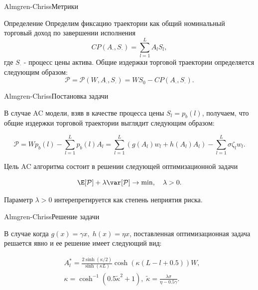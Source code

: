 \documentclass[aspectratio=169]{beamer}
\begin{document}
        \begin{frame}{Almgren-Chriss}{Метрики}
            \begin{block}{Определение}
                Определим фиксацию траектории как общий номинальный торговый доход по завершении исполнения  
                \begin{equation*}
                    CP( A_{\cdot}, S_{\cdot}) = \sum_{l=1}^L A_{l}S_l,
                \end{equation*}
                где $S_{\cdot}$ - процесс цены актива. 
                Общие издержки торговой траектории определяется следующим образом:
                \begin{equation*}
                    \mathcal P = \mathcal P(W, A_{\cdot}, S_{\cdot}) = WS_0 - CP(A_{\cdot}, S_{\cdot}).
                \end{equation*}
            \end{block}
        \end{frame}

        \begin{frame}{Almgren-Chriss}{Постановка задачи}

                В случае AC модели, взяв в качестве процесса цены $S_l = p_b(l)$, получаем, что общие издержки торговой траектории выглядит следующим образом:
        
            \begin{equation*}
                \mathcal P = Wp_b(l) - \sum\limits_{l=1}^L p_b(l)A_l = \sum\limits_{l=1}^L ( g(A_l)w_l + h(A_l)A_l) - \sum\limits_{l=1}^L \sigma \zeta_l w_l .
            \end{equation*}

            Цель AC алгоритма состоит в решении следующей оптимизационной задачи 

            \begin{equation*}
                \E [ \mathcal P] + \lambda \var[\mathcal P] \to \min, \quad \lambda > 0.
            \end{equation*}

            Параметр $\lambda > 0$ интерепретируется как степень неприятия риска.

        \end{frame}

        \begin{frame}{Almgren-Chriss}{Решение задачи}

            В случае когда $g(x) = \gamma x, \; h(x) = \eta x $, поставленная оптимизационная задача решается явно и ее решение имеет следующий вид:

            \begin{align} 
                &A_l^{*} = \frac{2 \sinh(\kappa/2)}{\sinh(\kappa L)}\cosh(\kappa (L - l + 0.5) )W, \label{Al}\\
                &\kappa = \cosh^{-1}(0.5\tilde \kappa^2 + 1), \; \tilde \kappa = \frac{\lambda \sigma}{\eta - 0.5 \gamma}. \label{kappa}
            \end{align}

        \end{frame}
\end{document}
